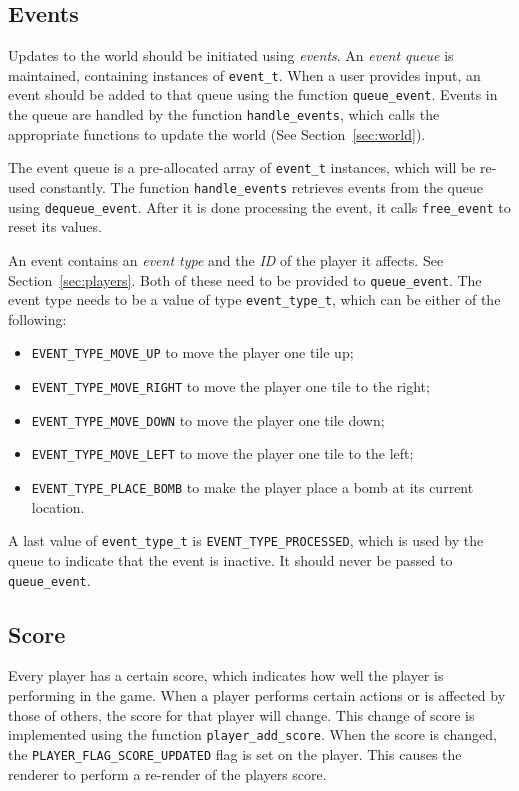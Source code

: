 \subsection{Events}
\label{sec:events}

Updates to the world should be initiated using \emph{events}. An \emph{event
  queue} is maintained, containing instances of \texttt{event\_t}. When a user
provides input, an event should be added to that queue using the function
\texttt{queue\_event}. Events in the queue are handled by the function
\texttt{handle\_events}, which calls the appropriate functions to update the
world (See Section~\ref{sec:world}).

The event queue is a pre-allocated array of \texttt{event\_t} instances, which
will be re-used constantly. The function \texttt{handle\_events} retrieves
events from the queue using \texttt{dequeue\_event}. After it is done
processing the event, it calls \texttt{free\_event} to reset its values.

An event contains an \emph{event type} and the \emph{ID} of the player it
affects. See Section~\ref{sec:players}. Both of these need to be provided to
\texttt{queue\_event}. The event type needs to be a value of type
\texttt{event\_type\_t}, which can be either of the following:

\begin{itemize}
\item \texttt{EVENT\_TYPE\_MOVE\_UP} to move the player one tile up;
\item \texttt{EVENT\_TYPE\_MOVE\_RIGHT} to move the player one tile to the
  right;
\item \texttt{EVENT\_TYPE\_MOVE\_DOWN} to move the player one tile down;
\item \texttt{EVENT\_TYPE\_MOVE\_LEFT} to move the player one tile to the left;
\item \texttt{EVENT\_TYPE\_PLACE\_BOMB} to make the player place a bomb at its
  current location.
\end{itemize}

A last value of \texttt{event\_type\_t} is \texttt{EVENT\_TYPE\_PROCESSED},
which is used by the queue to indicate that the event is inactive. It should
never be passed to \texttt{queue\_event}.

\subsection{Score}
\label{sec:score}

Every player has a certain score, which indicates how well the player is
performing in the game. When a player performs certain actions or is affected
by those of others, the score for that player will change. This change of score
is implemented using the function \texttt{player\_add\_score}. When the score
is changed, the \texttt{PLAYER\_FLAG\_SCORE\_UPDATED} flag is set on the
player. This causes the renderer to perform a re-render of the players score.

